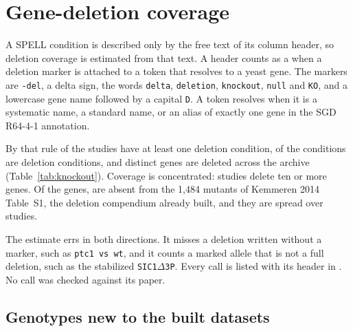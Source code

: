 
\section{Gene-deletion coverage}\label{sec:knockout}

A SPELL condition is described only by the free text of its column header, so
deletion coverage is estimated from that text. A header counts as a
 when a deletion marker is attached to a token that
resolves to a yeast gene. The markers are \texttt{-del}, a delta sign, the words
\texttt{delta}, \texttt{deletion}, \texttt{knockout}, \texttt{null} and
\texttt{KO}, and a lowercase gene name followed by a capital \texttt{D}. A token
resolves when it is a systematic name, a standard name, or an alias of exactly
one gene in the SGD R64-4-1 annotation.

By that rule \spellNKoStudies{} of the \spellNStudies{} studies have at least
one deletion condition, \spellNKoConditions{} of the \spellNConditions{}
conditions are deletion conditions, and \spellNKoGenes{} distinct genes are
deleted across the archive (Table~\ref{tab:knockout}). Coverage is concentrated:
\spellNKoStudiesTenPlus{} studies delete ten or more genes. Of the
\spellNKoGenes{} genes, \spellNKoGenesNew{} are absent from the 1,484 mutants of
Kemmeren 2014 Table~S1, the deletion compendium already built, and they are
spread over \spellNKoStudiesNew{} studies.

The estimate errs in both directions. It misses a deletion written without a
marker, such as \texttt{ptc1 vs wt}, and it counts a marked allele that is not a
full deletion, such as the stabilized \texttt{SIC1$\Delta$3P}. Every call is
listed with its header in
. No call was
checked against its paper.

\subsection{Genotypes new to the built datasets}\label{sec:new}

